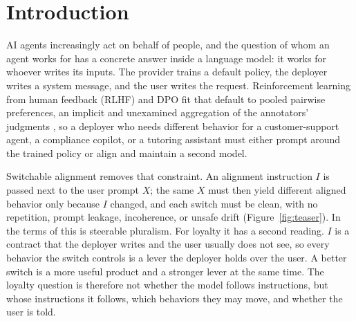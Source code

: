 \documentclass[letterpaper]{article} %
\begin{document}
\section{Introduction}

AI agents increasingly act on behalf of people, and the question of whom an agent works for has a concrete answer inside a language model: it works for whoever writes its inputs. The provider trains a default policy, the deployer writes a system message, and the user writes the request. Reinforcement learning from human feedback (RLHF) and DPO \cite{rafailov2023direct} fit that default to pooled pairwise preferences, an implicit and unexamined aggregation of the annotators' judgments \cite{conitzer2024social}, so a deployer who needs different behavior for a customer-support agent, a compliance copilot, or a tutoring assistant must either prompt around the trained policy or align and maintain a second model.

Switchable alignment removes that constraint. An alignment instruction $I$ is passed next to the user prompt $X$; the same $X$ must then yield different aligned behavior only because $I$ changed, and each switch must be clean, with no repetition, prompt leakage, incoherence, or unsafe drift (Figure~\ref{fig:teaser}). In the terms of \citet{sorensen2024roadmap} this is steerable pluralism. For loyalty it has a second reading. $I$ is a contract that the deployer writes and the user usually does not see, so every behavior the switch controls is a lever the deployer holds over the user. A better switch is a more useful product and a stronger lever at the same time. The loyalty question is therefore not whether the model follows instructions, but whose instructions it follows, which behaviors they may move, and whether the user is told.
\end{document}
